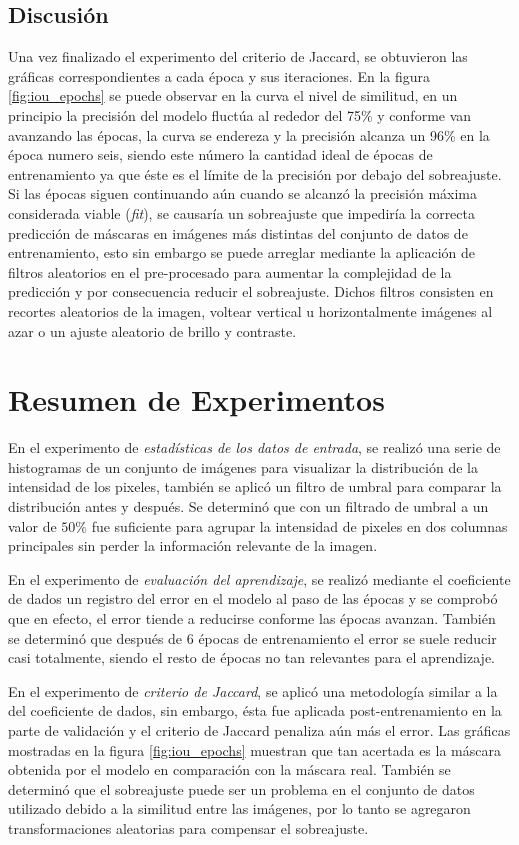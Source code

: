 \subsection{Discusión}
Una vez finalizado el experimento del criterio de Jaccard, se obtuvieron las gráficas correspondientes a cada época y sus iteraciones. En la figura \ref{fig:iou_epochs} se puede observar en la curva el nivel de similitud, en un principio la precisión del modelo fluctúa al rededor del 75\% y conforme van avanzando las épocas, la curva se endereza y la precisión alcanza un 96\% en la época numero seis, siendo este número la cantidad ideal de épocas de entrenamiento ya que éste es el límite de la precisión por debajo del sobreajuste. Si las épocas siguen continuando aún cuando se alcanzó la precisión máxima considerada viable (\emph{fit}), se causaría un sobreajuste que impediría la correcta predicción de máscaras en imágenes más distintas del conjunto de datos de entrenamiento, esto sin embargo se puede arreglar mediante la aplicación de filtros aleatorios en el pre-procesado para aumentar la complejidad de la predicción y por consecuencia reducir el sobreajuste. Dichos filtros consisten en recortes aleatorios de la imagen, voltear vertical u horizontalmente imágenes al azar o un ajuste aleatorio de brillo y contraste.


\section{Resumen de Experimentos}

En el experimento de \emph{estadísticas de los datos de entrada}, se realizó una serie de histogramas de un conjunto de imágenes para visualizar la distribución de la intensidad de los pixeles, también se aplicó un filtro de umbral para comparar la distribución antes y después. Se determinó que con un filtrado de umbral a un valor de $50\%$ fue suficiente para agrupar la intensidad de pixeles en dos columnas principales sin perder la información relevante de la imagen.

En el experimento de \emph{evaluación del aprendizaje}, se realizó mediante el coeficiente de dados un registro del error en el modelo al paso de las épocas y se comprobó que en efecto, el error tiende a reducirse conforme las épocas avanzan. También se determinó que después de 6 épocas de entrenamiento el error se suele reducir casi totalmente, siendo el resto de épocas no tan relevantes para el aprendizaje.

En el experimento de \emph{criterio de Jaccard}, se aplicó una metodología similar a la del coeficiente de dados, sin embargo, ésta fue aplicada post-entrenamiento en la parte de validación y el criterio de Jaccard penaliza aún más el error. Las gráficas mostradas en la figura \ref{fig:iou_epochs} muestran que tan acertada es la máscara obtenida por el modelo en comparación con la máscara real. También se determinó que el sobreajuste puede ser un problema en el conjunto de datos utilizado debido a la similitud entre las imágenes, por lo tanto se agregaron transformaciones aleatorias para compensar el sobreajuste.


